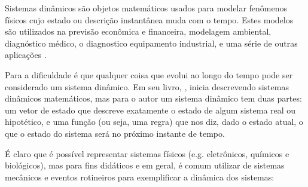 Sistemas dinâmicos são objetos matemáticos usados para modelar fenômenos físicos cujo estado ou descrição instantânea muda com o tempo. Estes modelos são utilizados na previsão econômica e financeira, modelagem ambiental, diagnóstico médico, o diagnostico equipamento industrial, e uma série de outras aplicações \cite{Dean1991}.

Para  a dificuldade é que qualquer coisa que evolui ao longo do tempo pode ser considerado um sistema dinâmico. Em seu livro, , inicia descrevendo sistemas dinâmicos matemáticos, mas para o autor um sistema dinâmico tem duas partes: um vetor de estado que descreve exatamente o estado de algum sistema real ou hipotético, e uma função (ou seja, uma regra) que nos diz, dado o estado atual, o que o estado do sistema será no próximo instante de tempo.

É claro que é possível representar sistemas físicos (e.g. eletrônicos, químicos e biológicos), mas para fins didáticos e em geral, é comum utilizar de sistemas mecânicos e eventos rotineiros para exemplificar a dinâmica dos sistemas:

